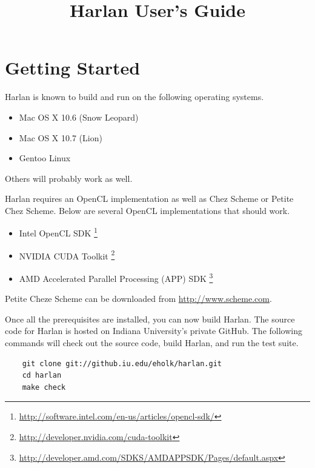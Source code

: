 \documentclass[oneside]{report}
\begin{document}

\title{Harlan User's Guide}

\maketitle

\tableofcontents

\chapter{Getting Started}

Harlan is known to build and run on the following operating systems.
\begin{itemize}
\item Mac OS X 10.6 (Snow Leopard)
\item Mac OS X 10.7 (Lion)
\item Gentoo Linux
\end{itemize}

Others will probably work as well.

Harlan requires an OpenCL implementation as well as Chez Scheme or
Petite Chez Scheme. Below are several OpenCL implementations that
should work.

\begin{itemize}
\item Intel OpenCL SDK
  \footnote{\url{http://software.intel.com/en-us/articles/opencl-sdk/}}
\item NVIDIA CUDA Toolkit
  \footnote{\url{http://developer.nvidia.com/cuda-toolkit}}
\item AMD Accelerated Parallel Processing (APP) SDK
  \footnote{\url{http://developer.amd.com/SDKS/AMDAPPSDK/Pages/default.aspx}}
\end{itemize}

Petite Cheze Scheme can be downloaded from
\url{http://www.scheme.com}.

Once all the prerequisites are installed, you can now build
Harlan. The source code for Harlan is hosted on Indiana University's
private GitHub. The following commands will check out the source code,
build Harlan, and run the test suite.

\begin{verbatim}
    git clone git://github.iu.edu/eholk/harlan.git
    cd harlan
    make check
\end{verbatim}
\end{document}
